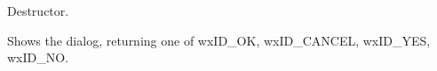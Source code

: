
\label{wxmessagedialogdtor}


Destructor.

\label{wxmessagedialogshowmodal}


Shows the dialog, returning one of wxID\_OK, wxID\_CANCEL, wxID\_YES, wxID\_NO.


